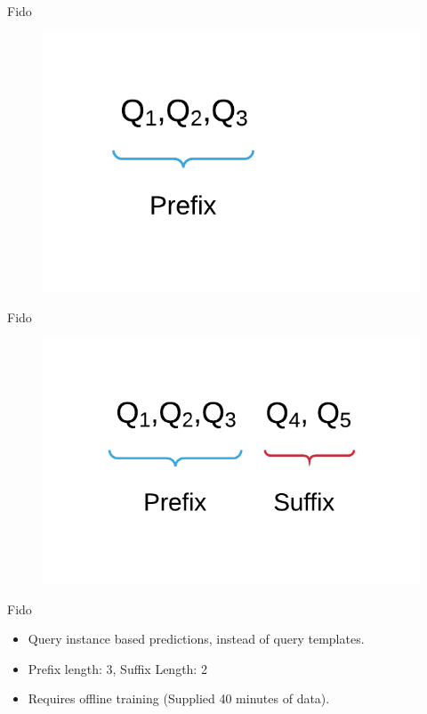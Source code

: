 \documentclass[10pt]{beamer}
\begin{document}
\begin{frame}[fragile]{Fido}
    \begin{figure}
        \center
        \includegraphics[scale=0.3]{apollo_fido_pred}
    \end{figure}
\end{frame}

\begin{frame}[fragile]{Fido}
    \begin{figure}
        \center
        \includegraphics[scale=0.3]{apollo_fido_pred_2}
    \end{figure}
\end{frame}

\begin{frame}[fragile]{Fido}
    \begin{itemize}
        \item{\alert{Query instance} based predictions, instead of query templates.}
        \item{Prefix length: 3, Suffix Length: 2}
        \item{Requires offline training (Supplied 40 minutes of data).}
    \end{itemize}
\end{frame}
\end{document}
